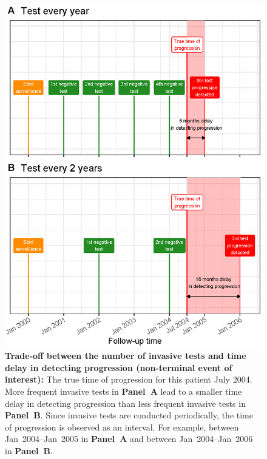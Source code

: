 \begin{figure}
\centerline{\includegraphics{images/delay_explanation.eps}}
\caption{\textbf{Trade-off between the number of invasive tests and time delay in detecting progression (non-terminal event of interest):} The true time of progression for this patient July 2004. More frequent invasive tests in \textbf{Panel~A} lead to a smaller time delay in detecting progression than less frequent invasive tests in \textbf{Panel~B}. Since invasive tests are conducted periodically, the time of progression is observed as an interval. For example, between Jan~2004--Jan~2005 in \textbf{Panel~A} and between Jan~2004--Jan~2006 in \textbf{Panel~B}.} 
\label{fig:delay_explanation}
\end{figure}


